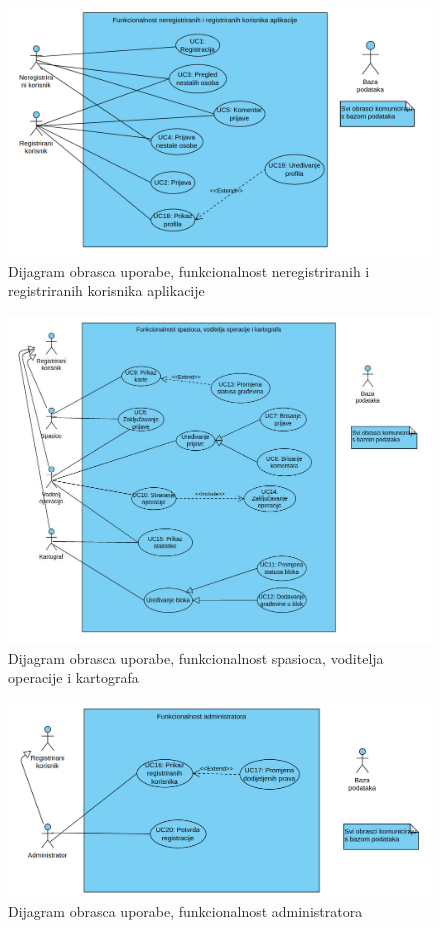 					\begin{figure}[H]      \includegraphics[width=\linewidth]{dijagrami/UML1.vpd.jpg}
					\caption{Dijagram obrasca uporabe, funkcionalnost neregistriranih i registriranih korisnika aplikacije}
	                \end{figure}
	                
				    \begin{figure}[h!] \includegraphics[width=\linewidth]{dijagrami/UML2.vpd.jpg}
				    \caption{Dijagram obrasca uporabe, funkcionalnost spasioca, voditelja operacije i kartografa}
				    \end{figure}
				    
				    \begin{figure}[h!] \includegraphics[width=\linewidth]{dijagrami/UML3.vpd.jpg} 
				    \caption{Dijagram obrasca uporabe, funkcionalnost administratora}
				    \end{figure} 
					
